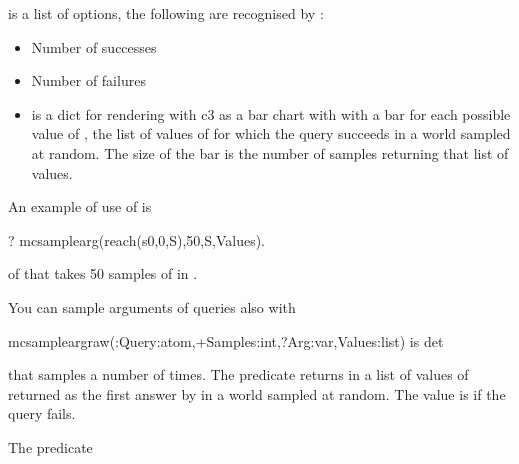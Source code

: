 \documentclass[letterpaper,10pt,english]{sphinxmanual}
\begin{document}
 is a list of options, the following are recognised by :
\begin{itemize}
\item {} 
 Number of successes

\item {} 
 Number of failures

\item {} 
  is a dict for rendering with c3 as a bar chart with with a bar for each possible value of , the list of values of  for which the query succeeds in a world sampled at random. The size of the bar is the number of samples returning that list of values.

\end{itemize}

An example of use of  is

\begin{sphinxVerbatim}[commandchars=\\\{\}]
?\PYGZhy{} mc\PYGZus{}sample\PYGZus{}arg(reach(s0,0,S),50,S,Values).
\end{sphinxVerbatim}

of  that takes 50 samples of  in .

You can sample arguments of queries also with

\begin{sphinxVerbatim}[commandchars=\\\{\}]
mc\PYGZus{}sample\PYGZus{}arg\PYGZus{}raw(:Query:atom,+Samples:int,?Arg:var,\PYGZhy{}Values:list) is det
\end{sphinxVerbatim}

that samples  a number of  times. The predicate returns in  a list of values of  returned as the first answer by  in a world sampled at random.
The value is  if the query fails.

The predicate
\end{document}
